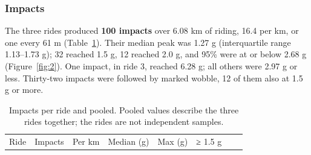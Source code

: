 \subsubsection{Impacts}\label{impacts}


The three rides produced \textbf{100 impacts} over 6.08 km of riding, 16.4 per km, or one
every 61 m (Table~\ref{tab:2}). Their median peak was 1.27 g (interquartile range 1.13--1.73 g);
32 reached 1.5 g, 12 reached 2.0 g, and 95\% were at or below 2.68 g (Figure~\ref{fig:2}). One impact,
in ride 3, reached 6.28 g; all others were 2.97 g or less. Thirty-two impacts were
followed by marked wobble, 12 of them also at 1.5 g or more.

\begin{longtable}[]{@{}
  >{\raggedright\arraybackslash}p{}
  >{\raggedright\arraybackslash}p{}
  >{\raggedright\arraybackslash}p{}
  >{\raggedright\arraybackslash}p{}
  >{\raggedright\arraybackslash}p{}
  >{\raggedright\arraybackslash}p{}
  >{\raggedright\arraybackslash}p{}
  >{\raggedright\arraybackslash}p{}@{}}
\caption{Impacts per ride and pooled. Pooled values describe the three rides together; the rides are not independent samples.}\label{tab:2}\tabularnewline
\toprule\noalign{}
\begin{minipage}[b]{\linewidth}\raggedright
Ride
\end{minipage} & \begin{minipage}[b]{\linewidth}\raggedright
Impacts
\end{minipage} & \begin{minipage}[b]{\linewidth}\raggedright
Per km
\end{minipage} & \begin{minipage}[b]{\linewidth}\raggedright
Median (g)
\end{minipage} & \begin{minipage}[b]{\linewidth}\raggedright
Max (g)
\end{minipage} & \begin{minipage}[b]{\linewidth}\raggedright
≥ 1.5 g
\end{minipage} & \begin{minipage}[b]{\linewidth}\raggedright

\end{minipage}
\end{longtable}
